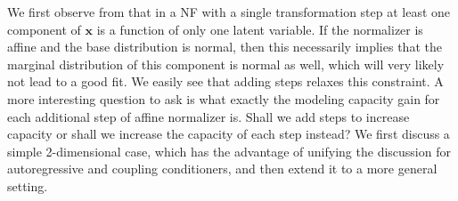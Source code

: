 We first observe from  that in a NF with a single transformation step at least one component of $\mathbf{x}$ is a function of only one latent variable.
If the normalizer is affine and the base distribution is normal, then this necessarily implies that the marginal distribution of this component is normal as well, which will very likely not lead to a good fit.
We easily see that adding steps relaxes this constraint.
A more interesting question to ask is what exactly the modeling capacity gain for each additional step of affine normalizer is. Shall we add steps to increase capacity or shall we increase the capacity of each step instead?
We first discuss a simple 2-dimensional case, which has the advantage of unifying the discussion for autoregressive and coupling conditioners, and then extend it to a more general setting.


